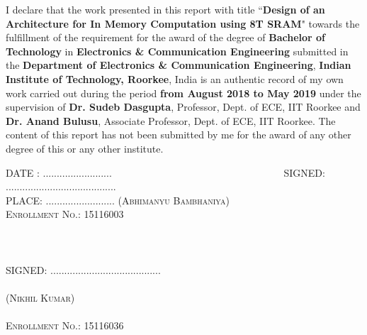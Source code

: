 \begin{SingleSpacing}
\vspace{-5mm}
I declare that the work presented in this report with title ``\textbf{Design of an Architecture for In Memory Computation using 8T SRAM}" towards the fulfillment of the requirement for the award of the degree of \textbf{Bachelor of Technology} in \textbf{Electronics \& Communication Engineering} submitted in the \textbf{Department of Electronics \& Communication Engineering}, \textbf{Indian Institute of Technology, Roorkee}, India is an authentic record of my own work carried out during the period \textbf{from August 2018 to May 2019} under the supervision of \textbf{Dr. Sudeb Dasgupta}, Professor, Dept. of ECE, IIT Roorkee and \textbf{Dr. Anand Bulusu}, Associate Professor, Dept. of ECE, IIT Roorkee.
\noindent The content of this report has not been submitted by me for the award of any other degree of this or any other institute.

\vspace{3cm}
\noindent
\textsc{DATE : ......................... ~~~~~~~~~~~~~~~~~~~~~~~~~~~~~~~~~~SIGNED: ........................................}\\
\textsc{PLACE: .........................}
\nobreak
\hfill \textsc{(Abhimanyu Bambhaniya)} \\
\vspace{-4 mm}
\nobreak
\hfill \textsc{Enrollment No.: 15116003}
\\\\\\\\
\vspace{-4 mm}
\nobreak
\hfill\textsc{SIGNED: ........................................}\\\\
\vspace{-4 mm}
\nobreak
\hfill \textsc{(Nikhil Kumar)} \\\\
\vspace{-4 mm}
\nobreak
\hfill \textsc{Enrollment No.: 15116036}

\end{SingleSpacing}
\clearpage 